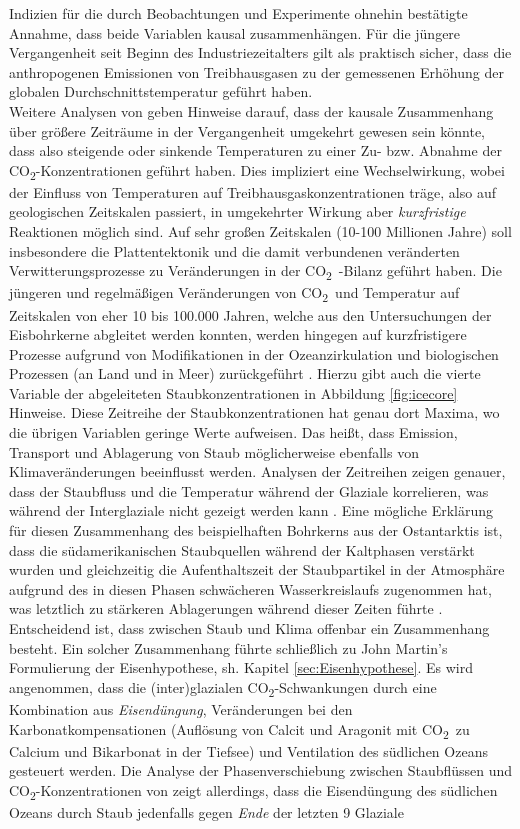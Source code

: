 \documentclass[12pt,a4paper,onecolumn]{scrartcl}
\newcommand{\cotwo}{CO\textsubscript{2}}
\begin{document}
Indizien für die durch Beobachtungen und Experimente ohnehin bestätigte Annahme, dass beide Variablen kausal zusammenhängen. Für die jüngere Vergangenheit seit Beginn des Industriezeitalters gilt als praktisch sicher, dass die anthropogenen Emissionen von Treibhausgasen zu der gemessenen Erhöhung der globalen Durchschnittstemperatur geführt haben.  \\

Weitere Analysen von \citet{Stips.2016} geben Hinweise darauf, dass der kausale Zusammenhang über größere Zeiträume in der Vergangenheit umgekehrt gewesen sein könnte, dass also steigende oder sinkende Temperaturen zu einer Zu- bzw. Abnahme der \cotwo -Konzentrationen geführt haben. Dies impliziert eine Wechselwirkung, wobei der Einfluss von Temperaturen auf Treibhausgaskonzentrationen träge, also auf geologischen Zeitskalen passiert, in umgekehrter Wirkung aber \textit{kurzfristige} Reaktionen möglich sind.  Auf sehr großen Zeitskalen (10-100 Millionen Jahre) soll insbesondere die Plattentektonik und die damit verbundenen veränderten Verwitterungsprozesse zu Veränderungen in der \cotwo \ -Bilanz geführt haben. Die jüngeren und regelmäßigen Veränderungen von \cotwo \ und Temperatur auf Zeitskalen von eher 10 bis 100.000 Jahren, welche aus den Untersuchungen der Eisbohrkerne abgleitet werden konnten, werden hingegen auf kurzfristigere Prozesse aufgrund von Modifikationen in der Ozeanzirkulation und biologischen Prozessen (an Land und in Meer) zurückgeführt \citep{Emerson.2009}. Hierzu gibt auch die vierte Variable der abgeleiteten Staubkonzentrationen in Abbildung \ref{fig:icecore} Hinweise. Diese Zeitreihe der Staubkonzentrationen hat genau dort Maxima, wo die übrigen Variablen geringe Werte aufweisen. Das heißt, dass Emission, Transport und Ablagerung von Staub möglicherweise ebenfalls von Klimaveränderungen beeinflusst werden. Analysen der Zeitreihen zeigen genauer, dass der Staubfluss und die Temperatur während der Glaziale korrelieren, was während der Interglaziale nicht gezeigt werden kann \citep{Lambert.2008}. Eine mögliche Erklärung für diesen Zusammenhang des beispielhaften Bohrkerns aus der Ostantarktis ist, dass die südamerikanischen Staubquellen während der Kaltphasen verstärkt wurden und gleichzeitig die Aufenthaltszeit der Staubpartikel in der Atmosphäre aufgrund des in diesen Phasen schwächeren Wasserkreislaufs zugenommen hat, was letztlich zu stärkeren Ablagerungen während dieser Zeiten führte \citep{Lambert.2008}. Entscheidend ist, dass zwischen Staub und Klima offenbar ein Zusammenhang besteht. Ein solcher Zusammenhang führte schließlich zu John Martin's Formulierung der Eisenhypothese, sh. Kapitel \ref{sec:Eisenhypothese}. Es wird angenommen, dass die (inter)glazialen \cotwo -Schwankungen durch eine Kombination aus \textit{Eisendüngung}, Veränderungen bei den Karbonatkompensationen (Auflösung von Calcit und Aragonit mit  \cotwo \ zu Calcium und Bikarbonat in der Tiefsee) und Ventilation des südlichen Ozeans \citep{Lambert.2012} gesteuert werden. Die Analyse der Phasenverschiebung zwischen Staubflüssen und \cotwo -Konzentrationen von \citet{Lambert.2012} zeigt allerdings, dass die Eisendüngung des südlichen Ozeans durch Staub jedenfalls gegen \textit{Ende} der letzten 9 Glaziale 
\end{document}

